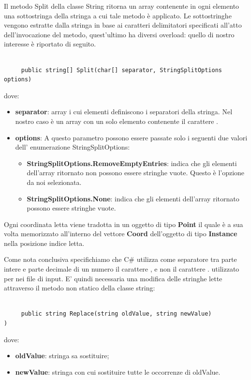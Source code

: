 \documentclass[11pt]{article}
\begin{document}
Il metodo Split della classe String ritorna un array contenente in ogni elemento una sottostringa della stringa a cui tale metodo \`e applicato. Le sottostringhe vengono estratte dalla stringa in base ai caratteri delimitatori specificati all'atto dell'invocazione del metodo, quest'ultimo ha diversi overload: quello di nostro interesse \`e riportato di seguito.

\begin{lstlisting}

     public string[] Split(char[] separator, StringSplitOptions options)

\end{lstlisting}

dove:

\begin{itemize}
\item \textbf{separator}: array i cui elementi definiscono i separatori della stringa. Nel nostro caso è un array con un solo elemento contenente il carattere    .
\item \textbf{options}: A questo parametro possono essere passate solo i seguenti due valori dell' enumerazione StringSplitOptions:

\begin{itemize}

\item \textbf{StringSplitOptions.RemoveEmptyEntries}: indica che gli elementi dell'array ritornato non possono essere stringhe vuote. Questo è l'opzione da noi selezionata.
\item \textbf{StringSplitOptions.None}: indica che gli elementi dell'array ritornato possono essere stringhe vuote.

\end{itemize}

\end{itemize}

Ogni coordinata letta viene tradotta in un oggetto di tipo \textbf{Point} il quale è a sua volta memorizzato all'interno del vettore \textbf{Coord} dell'oggetto di tipo \textbf{Instance} nella posizione indice letta.

Come nota conclusiva specifichiamo che C\# utilizza come separatore tra parte intere e parte decimale di un numero il carattere , e non il carattere . utilizzato per nei file di input. E' quindi necessaria una modifica delle stringhe lette attraverso il metodo non statico della classe string:

\begin{lstlisting}

     public string Replace(string oldValue, string newValue)
)

\end{lstlisting}
dove:
\begin{itemize}
	\item \textbf{oldValue}: stringa sa sostituire;
	\item \textbf{newValue}: stringa con cui sostituire tutte le occorrenze di oldValue.
\end{itemize}
\end{document}

